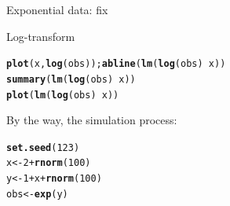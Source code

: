 \documentclass[10pt]{beamer}\usepackage[]{graphicx}\usepackage[]{color}
\makeatletter
\newcommand{\hlnum}[1]{\textcolor[rgb]{0.686,0.059,0.569}{#1}}%
\newcommand{\hlopt}[1]{\textcolor[rgb]{0,0,0}{#1}}%
\newcommand{\hlstd}[1]{\textcolor[rgb]{0.345,0.345,0.345}{#1}}%
\newcommand{\hlkwb}[1]{\textcolor[rgb]{0.69,0.353,0.396}{#1}}%
\newcommand{\hlkwd}[1]{\textcolor[rgb]{0.737,0.353,0.396}{\textbf{#1}}}%
\newenvironment{kframe}{%
 \def\at@end@of@kframe{}%
 \ifinner\ifhmode%
  \def\at@end@of@kframe{\end{minipage}}%
  \begin{minipage}{\columnwidth}%
 \fi\fi%
 \def\FrameCommand##1{\hskip\@totalleftmargin \hskip-\fboxsep
 \colorbox{shadecolor}{##1}\hskip-\fboxsep
     \hskip-\linewidth \hskip-\@totalleftmargin \hskip\columnwidth}%
 \MakeFramed {\advance\hsize-\width
   \@totalleftmargin\z@ \linewidth\hsize
   \@setminipage}}%
 {\par\unskip\endMakeFramed%
 \at@end@of@kframe}
\newenvironment{knitrout}{}{} %
\makeatother
\begin{document}
\begin{frame}[fragile]{Exponential data: fix}

Log-transform
\begin{knitrout}\small
{}\color{fgcolor}\begin{kframe}
\begin{alltt}
\hlkwd{plot}\hlstd{(x,} \hlkwd{log}\hlstd{(obs));} \hlkwd{abline}\hlstd{(}\hlkwd{lm}\hlstd{(}\hlkwd{log}\hlstd{(obs)} \hlopt{~} \hlstd{x))}
\hlkwd{summary}\hlstd{(}\hlkwd{lm}\hlstd{(}\hlkwd{log}\hlstd{(obs)} \hlopt{~} \hlstd{x))}
\hlkwd{plot}\hlstd{(}\hlkwd{lm}\hlstd{(}\hlkwd{log}\hlstd{(obs)} \hlopt{~} \hlstd{x))}
\end{alltt}
\end{kframe}
\end{knitrout}

\pause
By the way, the simulation process:
\begin{knitrout}\small
{}\color{fgcolor}\begin{kframe}
\begin{alltt}
\hlkwd{set.seed}\hlstd{(}\hlnum{123}\hlstd{)}
\hlstd{x} \hlkwb{<-} \hlnum{2}\hlopt{+}\hlkwd{rnorm}\hlstd{(}\hlnum{100}\hlstd{)}
\hlstd{y} \hlkwb{<-} \hlnum{1} \hlopt{+} \hlstd{x} \hlopt{+} \hlkwd{rnorm}\hlstd{(}\hlnum{100}\hlstd{)}
\hlstd{obs} \hlkwb{<-} \hlkwd{exp}\hlstd{(y)}
\end{alltt}
\end{kframe}
\end{knitrout}

\end{frame}
\end{document}
